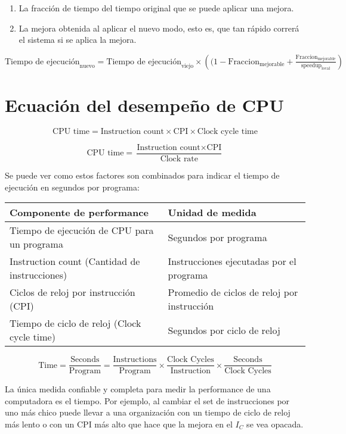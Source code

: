 \begin{enumerate}
 \item La fracción de tiempo del tiempo original que se puede aplicar una mejora.
 \item La mejora obtenida al aplicar el nuevo modo, esto es, que tan rápido correrá el sistema si se aplica la mejora.
\end{enumerate}


$
\text{Tiempo de ejecución}_\text{nuevo} = \text{Tiempo de ejecución}_\text{viejo}  \times \left( (1 -  \text{Fraccion}_\text{mejorable} + \frac{\text{Fraccion}_\text{mejorable}}{\text{speedup}_\text{local}} \right)
$


\section{Ecuación del desempeño de CPU}

\[ \text{CPU time} = \text{Instruction count} \times \text{CPI} \times \text{Clock cycle time} \]

\[ \text{CPU time} = \frac{\text{Instruction count} \times \text{CPI}}{ \text{Clock rate}} \]

Se puede ver como estos factores son combinados para indicar el tiempo de ejecución en segundos por programa:


\begin{table}[h!]
\centering
\begin{tabular}{|l|l|}
\hline
   
\textbf{Componente de performance} & \textbf{Unidad de medida}  \\ \hline
Tiempo de ejecución de CPU para un programa & Segundos por programa \\ \hline
Instruction count (Cantidad de instrucciones) & Instrucciones ejecutadas por el programa \\ \hline
Ciclos de reloj por instrucción (CPI) & Promedio de ciclos de reloj por instrucción \\ \hline
Tiempo de ciclo de reloj (Clock cycle time) & Segundos por ciclo de reloj \\ \hline
\end{tabular}
\end{table}

\[ \text{Time} = \frac{\text{Seconds}}{\text{Program}}= \frac{\text{Instructions}}{\text{Program}} \times \frac{\text{Clock Cycles}}{\text{Instruction}} \times \frac{\text{Seconds}}{\text{Clock Cycles}} \]

La única medida confiable y completa para medir la performance de una computadora es el tiempo. Por ejemplo, al cambiar el set de instrucciones por uno más chico puede llevar a una organización con un tiempo de ciclo de reloj más lento o con un CPI más alto que hace que la mejora en el $I_C$ se vea opacada.

